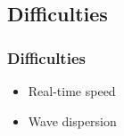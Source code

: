 \subsection{Difficulties}

\begin{frame}
\frametitle{Difficulties}

\begin{itemize}[<+(1)->]
\item Real-time speed
\item Wave dispersion
\end{itemize}
\end{frame}